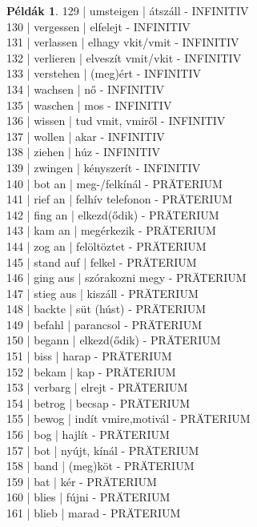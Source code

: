 \documentclass{article}
\theoremstyle{definition}
\newtheorem*{exmp}{Példák}
\begin{document}
\begin{exmp}
129 | umsteigen | átszáll - INFINITIV\\
130 | vergessen | elfelejt - INFINITIV\\
131 | verlassen | elhagy vkit/vmit - INFINITIV\\
132 | verlieren | elveszít vmit/vkit - INFINITIV\\
133 | verstehen | (meg)ért - INFINITIV\\
134 | wachsen | nő - INFINITIV\\
135 | waschen | mos - INFINITIV\\
136 | wissen | tud vmit, vmiről - INFINITIV\\
137 | wollen | akar - INFINITIV\\
138 | ziehen | húz - INFINITIV\\
139 | zwingen | kényszerít - INFINITIV\\
140 | bot an | meg-/felkínál - PRÄTERIUM\\
141 | rief an | felhív telefonon - PRÄTERIUM\\
142 | fing an | elkezd(ődik) - PRÄTERIUM\\
143 | kam an  | megérkezik - PRÄTERIUM\\
144 | zog an | felöltöztet - PRÄTERIUM\\
145 | stand auf | felkel - PRÄTERIUM\\
146 | ging aus | szórakozni megy - PRÄTERIUM\\
147 | stieg aus | kiszáll - PRÄTERIUM\\
148 | backte | süt (húst) - PRÄTERIUM\\
149 | befahl | parancsol - PRÄTERIUM\\
150 | begann | elkezd(ődik) - PRÄTERIUM\\
151 | biss | harap - PRÄTERIUM\\
152 | bekam | kap - PRÄTERIUM\\
153 | verbarg | elrejt - PRÄTERIUM\\
154 | betrog | becsap - PRÄTERIUM\\
155 | bewog | indít vmire,motivál - PRÄTERIUM\\
156 | bog | hajlít - PRÄTERIUM\\
157 | bot | nyújt, kínál - PRÄTERIUM\\
158 | band | (meg)köt - PRÄTERIUM\\
159 | bat | kér - PRÄTERIUM\\
160 | blies | fújni - PRÄTERIUM\\
161 | blieb | marad - PRÄTERIUM\\

\end{exmp}
\end{document}
